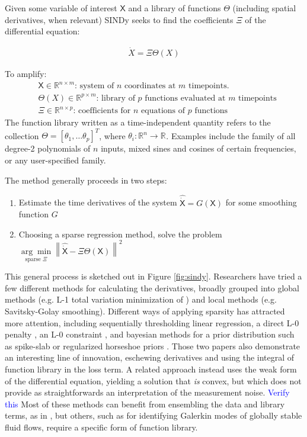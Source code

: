 \documentclass{article}
\newcommand{\blue}[1]{\textcolor{blue}{#1}}
\newcommand{\mat}[1]{\boldsymbol{\mathsf{#1}}}
\newcommand{\R}[1]{\mathbb{R}^{#1}}
\begin{document}
Given some variable of interest $\mat X$ and a library of functions $\mat \Theta$ (including spatial derivatives, when relevant) SINDy seeks to find the coefficients $\mat \Xi$ of the differential equation:

\begin{align}
    \label{eqn:sindy_ode}
    \dot X = \Xi\Theta(X)
\end{align}

To amplify:
\begin{align*}
    &\mat X \in \R{n \times m}\text{: system of $n$ coordinates at $m$ timepoints.}\\
    &\mat \Theta(X) \in \R{p \times m}\text{: library of $p$ functions evaluated at $m$ timepoints}\\
    &\mat \Xi \in \R{n \times p}\text{: coefficients for $n$ equations of $p$ functions}
\end{align*}
The function library written as a time-independent quantity refers to the collection $\mat \Theta = [\theta_1, \dots \theta_p]^T$, where $\theta_i: \R{n}\rightarrow\R{}$. Examples include the family of all degree-2 polynomials of $n$ inputs, mixed sines and cosines of certain frequencies, or any user-specified family.

The method generally proceeds in two steps:

\begin{enumerate}
    \item Estimate the time derivatives of the system ${\mat{\widehat{\dot X}}} = G(\mat X)$ for some smoothing function $G$
    \item Choosing a sparse regression method, solve the problem $\underset{\text{sparse } \mat \Xi}{\arg\min} \left\| \mat{\widehat{\dot{X}}} - \mat \Xi \mat \Theta(\mat X) \right\|^2$
\end{enumerate}
This general process is sketched out in Figure \ref{fig:sindy}.  Researchers have tried a few different methods for calculating the derivatives, broadly grouped into  global methods (e.g. L-1 total variation minimization of \cite{Chartrand2011}) and local methods (e.g. Savitsky-Golay smoothing).  Different ways of applying sparsity has attracted more attention, including sequentially thresholding linear regression, a direct L-0 penalty \cite{Champion2020}, an L-0 constraint \cite{Bertsimas2023}, and bayesian methods for a prior distribution such as spike-slab or regularized horseshoe priors \cite{Hirsh2022,gao2022bayesian}.  Those two papers also demonstrate an interesting line of innovation, eschewing derivatives and using the integral of function library in the loss term.  A related approach instead uses the weak form of the differential equation, yielding a solution that {\it is} convex, but which does not provide as straightforwards an interpretation of the measurement noise. \blue{Verify this}  Most of these methods can benefit from ensembling the data and library terms, as in \cite{Fasel2022}, but others, such as \cite{Kaptanoglu2021} for identifying Galerkin modes of globally stable fluid flows, require a specific form of function library.
\end{document}
